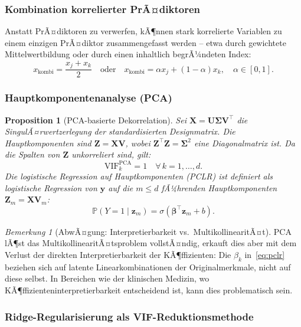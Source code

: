﻿\documentclass[12pt, a4paper]{article}
\newtheorem{proposition}[theorem]{Proposition}
\theoremstyle{definition}
\theoremstyle{remark}
\newtheorem{remark}[theorem]{Bemerkung}
\newcommand{\Prob}{\mathbb{P}}
\newcommand{\sigmoid}{\sigma}
\newcommand{\vy}{\bm{y}}
\newcommand{\vX}{\bm{X}}
\newcommand{\vz}{\bm{z}}
\newcommand{\T}{\top}
\begin{document}
\subsubsection{Kombination korrelierter PrÃ¤diktoren}

Anstatt PrÃ¤diktoren zu verwerfen, kÃ¶nnen stark korrelierte Variablen zu einem einzigen
PrÃ¤diktor zusammengefasst werden -- etwa durch gewichtete Mittelwertbildung oder durch
einen inhaltlich begrÃ¼ndeten Index:
\[
x_{\mathrm{kombi}} = \frac{x_j + x_k}{2} \quad \text{oder} \quad x_{\mathrm{kombi}} = \alpha x_j + (1-\alpha)x_k, \quad \alpha \in [0,1].
\]

\subsubsection{Hauptkomponentenanalyse (PCA)}

\begin{proposition}[PCA-basierte Dekorrelation]
	Sei $\vX = \bm{U}\bm{\Sigma}\bm{V}^\T$ die SingulÃ¤rwertzerlegung der standardisierten
	Designmatrix. Die Hauptkomponenten sind $\bm{Z} = \vX\bm{V}$, wobei $\bm{Z}^\T\bm{Z} = \bm{\Sigma}^2$
	eine Diagonalmatrix ist. Da die Spalten von $\bm{Z}$ unkorreliert sind, gilt:
	\[
	\mathrm{VIF}_k^{\mathrm{PCA}} = 1 \quad \forall\, k = 1, \ldots, d.
	\]
	Die \emph{logistische Regression auf Hauptkomponenten} (PCLR) ist definiert als logistische
	Regression von $\vy$ auf die $m \leq d$ fÃ¼hrenden Hauptkomponenten $\bm{Z}_m = \vX\bm{V}_m$:
	\begin{equation}
		\Prob(Y=1 \mid \vz_m) = \sigmoid(\bm{\beta}^\T\vz_m + b).
		\label{eq:pclr}
	\end{equation}
\end{proposition}

\begin{remark}[AbwÃ¤gung: Interpretierbarkeit vs.\ MultikollinearitÃ¤t]
	PCA lÃ¶st das MultikollinearitÃ¤tsproblem vollstÃ¤ndig, erkauft dies aber mit dem Verlust
	der direkten Interpretierbarkeit der KÃ¶ffizienten: Die $\beta_k$ in~\eqref{eq:pclr}
	beziehen sich auf latente Linearkombinationen der Originalmerkmale, nicht auf diese selbst.
	In Bereichen wie der klinischen Medizin, wo KÃ¶ffizienteninterpretierbarkeit entscheidend ist,
	kann dies problematisch sein.
\end{remark}

\subsubsection{Ridge-Regularisierung als VIF-Reduktionsmethode}
\end{document}
